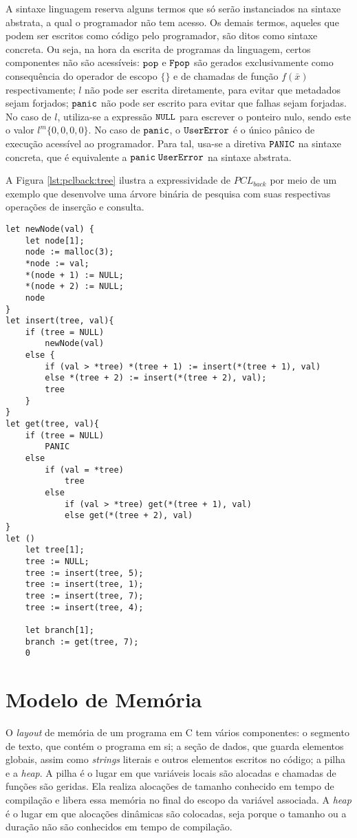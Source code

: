 A sintaxe linguagem reserva alguns termos que só serão instanciados na sintaxe abstrata, a qual o programador não tem acesso. Os demais termos, aqueles que podem ser escritos como código pelo programador, são ditos como sintaxe concreta. Ou seja, na hora da escrita de programas da linguagem, certos componentes não são acessíveis: $\texttt{pop}$ e $\texttt{Fpop}$ são gerados exclusivamente como consequência do operador de escopo $\{\}$ e de chamadas de função $f(\bar x)$ respectivamente; $l$ não pode ser escrita diretamente, para evitar que metadados sejam forjados; $\texttt{panic}$ não pode ser escrito para evitar que falhas sejam forjadas. No caso de $l$, utiliza-se a expressão $\texttt{NULL}$ para escrever o ponteiro nulo, sendo este o valor $l^m\{0, 0, 0, 0\}$. No caso de $\texttt{panic}$, o $\texttt{UserError}$ é o único pânico de execução acessível ao programador. Para tal, usa-se a diretiva $\texttt{PANIC}$ na sintaxe concreta, que é equivalente a $\texttt{panic}\;\texttt{UserError}$ na sintaxe abstrata.


A Figura \ref{lst:pclback:tree} ilustra a expressividade de $PCL_{back}$ por meio de um exemplo que desenvolve uma árvore binária de pesquisa com suas respectivas operações de inserção e consulta.
\newpage
\begin{lstlisting}[language=PCLback, label={lst:pclback:tree}, caption={Árvore Binária em $PCL_{back}$}]
let newNode(val) {
	let node[1];
	node := malloc(3);
	*node := val;
	*(node + 1) := NULL;
	*(node + 2) := NULL;
	node
}
let insert(tree, val){
	if (tree = NULL) 
		newNode(val)
	else {
		if (val > *tree) *(tree + 1) := insert(*(tree + 1), val)
		else *(tree + 2) := insert(*(tree + 2), val);
		tree
	}
}
let get(tree, val){
	if (tree = NULL) 
		PANIC
	else
		if (val = *tree)
			tree
		else
			if (val > *tree) get(*(tree + 1), val)
			else get(*(tree + 2), val)
}
let () 
	let tree[1];
	tree := NULL;
	tree := insert(tree, 5);
	tree := insert(tree, 1);
	tree := insert(tree, 7);
	tree := insert(tree, 4);

	let branch[1];
	branch := get(tree, 7);
	0
\end{lstlisting}

\section{Modelo de Memória}
\label{sec:memory-model}

O \emph{layout} de memória de um programa em C tem vários componentes: o segmento de texto, que contém o programa em si; a seção de dados, que guarda elementos globais, assim como \emph{strings} literais e outros elementos escritos no código; a pilha e a \emph{heap}. A pilha é o lugar em que variáveis locais são alocadas e chamadas de funções são geridas. Ela realiza alocações de tamanho conhecido em tempo de compilação e libera essa memória no final do escopo da variável associada. A \emph{heap} é o lugar em que alocações dinâmicas são colocadas, seja porque o tamanho ou a duração não são conhecidos em tempo de compilação.

